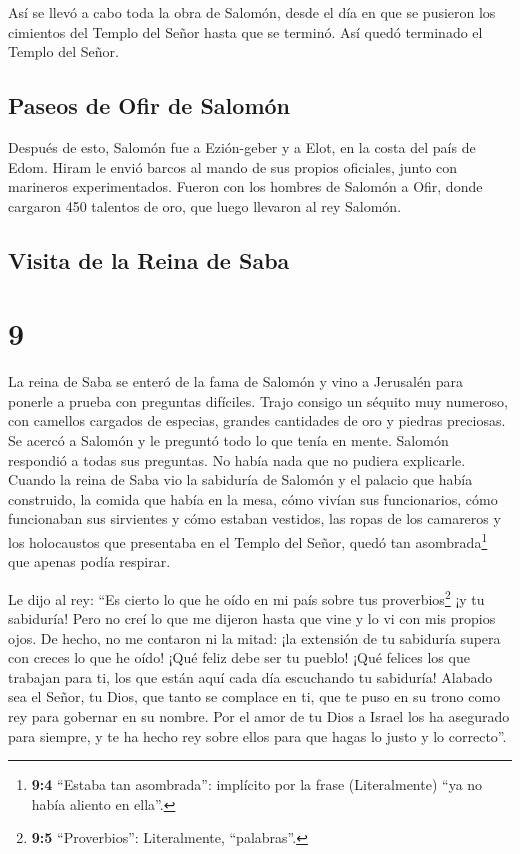  Así se llevó a cabo toda la obra de Salomón, desde el
día en que se pusieron los cimientos del Templo del Señor hasta que se
terminó. Así quedó terminado el Templo del Señor.

\hypertarget{paseos-de-ofir-de-salomuxf3n}{%
\subsection{Paseos de Ofir de
Salomón}\label{paseos-de-ofir-de-salomuxf3n}}

 Después de esto, Salomón fue a Ezión-geber y a Elot, en
la costa del país de Edom.  Hiram le envió barcos al
mando de sus propios oficiales, junto con marineros experimentados.
Fueron con los hombres de Salomón a Ofir, donde cargaron 450 talentos de
oro, que luego llevaron al rey Salomón.

\hypertarget{visita-de-la-reina-de-saba}{%
\subsection{Visita de la Reina de
Saba}\label{visita-de-la-reina-de-saba}}

\hypertarget{section-8}{%
\section{9}\label{section-8}}

 La reina de Saba se enteró de la fama de Salomón y vino a
Jerusalén para ponerle a prueba con preguntas difíciles. Trajo consigo
un séquito muy numeroso, con camellos cargados de especias, grandes
cantidades de oro y piedras preciosas. Se acercó a Salomón y le preguntó
todo lo que tenía en mente.  Salomón respondió a todas sus
preguntas. No había nada que no pudiera explicarle. 
Cuando la reina de Saba vio la sabiduría de Salomón y el palacio que
había construido,  la comida que había en la mesa, cómo
vivían sus funcionarios, cómo funcionaban sus sirvientes y cómo estaban
vestidos, las ropas de los camareros y los holocaustos que presentaba en
el Templo del Señor, quedó tan asombrada\footnote{\textbf{9:4} ``Estaba
  tan asombrada'': implícito por la frase (Literalmente) ``ya no había
  aliento en ella''.} que apenas podía respirar.

 Le dijo al rey: ``Es cierto lo que he oído en mi país
sobre tus proverbios\footnote{\textbf{9:5} ``Proverbios'': Literalmente,
  ``palabras''.} ¡y tu sabiduría!  Pero no creí lo que me
dijeron hasta que vine y lo vi con mis propios ojos. De hecho, no me
contaron ni la mitad: ¡la extensión de tu sabiduría supera con creces lo
que he oído!  ¡Qué feliz debe ser tu pueblo! ¡Qué felices
los que trabajan para ti, los que están aquí cada día escuchando tu
sabiduría!  Alabado sea el Señor, tu Dios, que tanto se
complace en ti, que te puso en su trono como rey para gobernar en su
nombre. Por el amor de tu Dios a Israel los ha asegurado para siempre, y
te ha hecho rey sobre ellos para que hagas lo justo y lo correcto''.

